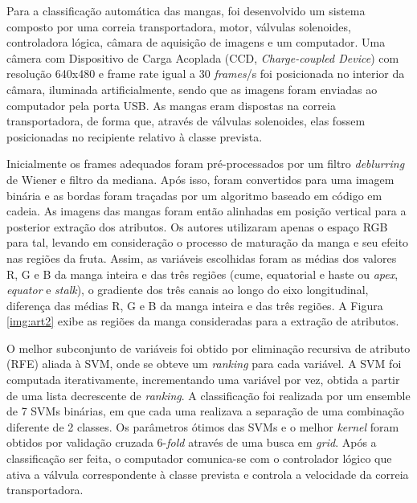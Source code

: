 Para a classificação automática das mangas, foi desenvolvido um sistema composto por uma correia transportadora, motor, válvulas solenoides, controladora lógica, câmara de aquisição de imagens e um computador. Uma câmera com Dispositivo de Carga Acoplada (CCD, \textit{Charge-coupled Device}) com resolução 640x480 e frame rate igual a 30 \textit{frames}/s foi posicionada no interior da câmara, iluminada artificialmente, sendo que as imagens foram enviadas ao computador pela porta USB. As mangas eram dispostas na correia transportadora, de forma que, através de válvulas solenoides, elas fossem posicionadas no recipiente relativo à classe prevista. 

Inicialmente os frames adequados foram pré-processados por um filtro \textit{deblurring} de Wiener e filtro da mediana. Após isso, foram convertidos para uma imagem binária e as bordas foram traçadas por um algoritmo baseado em código em cadeia. As imagens das mangas foram então alinhadas em posição vertical para a posterior extração dos atributos. Os autores utilizaram apenas o espaço RGB para tal, levando em consideração o processo de maturação da manga e seu efeito nas regiões da fruta. Assim, as variáveis escolhidas foram as médias dos valores R, G e B da manga inteira e das três regiões (cume, equatorial e haste ou \textit{apex}, \textit{equator} e \textit{stalk}), o gradiente dos três canais ao longo do eixo longitudinal, diferença das médias R, G e B da manga inteira e das três regiões. A Figura \ref{img:art2} exibe as regiões da manga consideradas para a extração de atributos.


O melhor subconjunto de variáveis foi obtido por eliminação recursiva de atributo (RFE) aliada à SVM, onde se obteve um \textit{ranking} para cada variável. A SVM foi computada iterativamente, incrementando uma variável por vez, obtida a partir de uma lista decrescente de \textit{ranking}. A classificação foi realizada por um ensemble de 7 SVMs binárias, em que cada uma realizava a separação de uma combinação diferente de 2 classes. Os parâmetros ótimos das SVMs e o melhor \textit{kernel} foram obtidos por validação cruzada 6-\textit{fold} através de uma busca em \textit{grid}. Após a classificação ser feita, o computador comunica-se com o controlador lógico que ativa a válvula correspondente à classe prevista e controla a velocidade da correia transportadora. 


